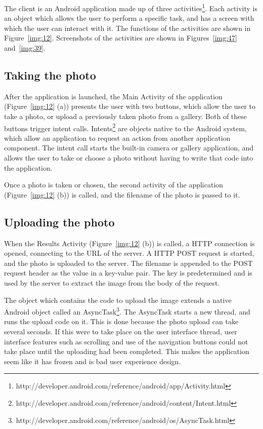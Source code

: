 \documentclass[11pt, a4paper]{report}
\begin{document}
The client is an Android application made up of three activities\footnote{http://developer.android.com/reference/android/app/Activity.html}. Each activity is an object which allows the user to perform a specific task, and has a screen with which the user can interact with it. The functions of the activities are shown in Figure~\ref{img:12}. Screenshots of the activities are shown in Figures~\ref{img:47} and~\ref{img:39}.



\subsection{Taking the photo}

After the application is launched, the Main Activity of the application (Figure~\ref{img:12} (a)) presents the user with two buttons, which allow the user to take a photo, or upload a previously taken photo from a gallery. Both of these buttons trigger intent calls. Intents\footnote{http://developer.android.com/reference/android/content/Intent.html} are objects native to the Android system, which allow an application to request an action from another application component. The intent call starts the built-in camera or gallery application, and allows the user to take or choose a photo without having to write that code into the application. 

Once a photo is taken or chosen, the second activity of the application (Figure~\ref{img:12} (b)) is called, and the filename of the photo is passed to it. 


\subsection{Uploading the photo}

When the Results Activity (Figure~\ref{img:12} (b)) is called, a HTTP connection is opened, connecting to the URL of the server. A HTTP POST request is started, and the photo is uploaded to the server. The filename is appended to the POST request header as the value in a key-value pair. The key is predetermined and is used by the server to extract the image from the body of the request. 

The object which contains the code to upload the image extends a native Android object called an AsyncTask\footnote{http://developer.android.com/reference/android/os/AsyncTask.html}. The AsyncTask starts a new thread, and runs the upload code on it. This is done because the photo upload can take several seconds. If this were to take place on the user interface thread, user interface features such as scrolling and use of the navigation buttons could not take place until the uploading had been completed. This makes the application seem like it has frozen and is bad user experience design.
\end{document}
